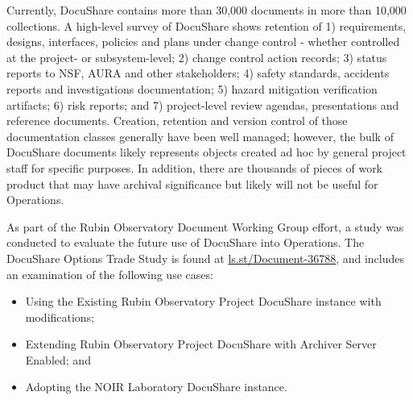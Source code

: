 Currently, DocuShare contains more than 30,000 documents in more than 10,000 collections. A high-level survey of DocuShare shows retention of 1) requirements, designs, interfaces, policies and plans under change control - whether controlled at the project- or subsystem-level; 2) change control action records; 3) status reports to NSF, AURA and other stakeholders; 4) safety standards, accidents reports and investigations documentation; 5) hazard mitigation verification artifacts; 6) risk reports; and 7) project-level review agendas, presentations and reference documents. Creation, retention and version control of those documentation classes generally have been well managed; however, the bulk of DocuShare documents likely represents objects created ad hoc by general project staff for specific purposes. In addition, there are thousands of pieces of work product that may have archival significance but likely will not be useful for Operations.

As part of the Rubin Observatory Document Working Group effort, a study was conducted to evaluate the future use of DocuShare into Operations.  The DocuShare Options Trade Study  is found at \url{ls.st/Document-36788}, and includes an examination of the following use cases:

\begin{itemize}
	\item Using the Existing Rubin Observatory Project DocuShare instance with modifications;
	\item Extending Rubin Observatory Project DocuShare with Archiver Server Enabled; and
	\item Adopting the NOIR Laboratory DocuShare instance.
\end{itemize}
